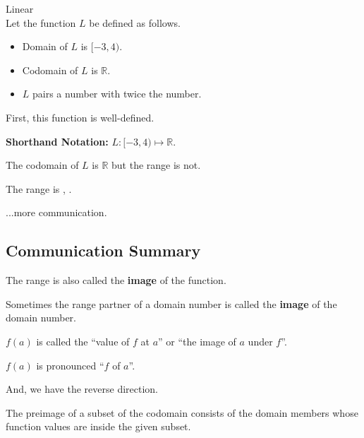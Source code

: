 \documentclass{ximera}
\begin{document}
\begin{example} Linear \\

Let the function $L$ be defined as follows.


\begin{itemize}
\item Domain of $L$ is $[-3, 4)$.
\item Codomain of $L$ is $\mathbb{R}$.
\item $L$ pairs a number with twice the number.
\end{itemize}


First, this function is well-defined. 


\textbf{Shorthand Notation: } $L: [-3, 4) \mapsto \mathbb{R}$.

\begin{question}

The codomain of $L$ is $\mathbb{R}$ but the range is not.  

The range is \wordChoice{\choice[correct]{[}\choice{(}}  ,  \wordChoice{\choice{]}\choice[correct]{)}}.

\end{question}



\end{example}
...more communication. \\






\subsection*{Communication Summary}







The range is also called the \textbf{image} of the function.   

Sometimes the range partner of a domain number is called the \textbf{image} of the domain number.

$f(a)$ is called the ``value of $f$ at $a$'' or ``the image of $a$ under $f$''.


$f(a)$ is pronounced ``$f$ of $a$''.


And, we have the reverse direction.

The preimage of a subset of the codomain consists of the domain members whose function values are inside the given subset.
\end{document}
